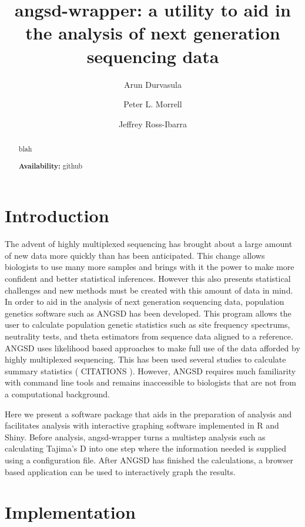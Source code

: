 \documentclass[12pt]{article}
\title{angsd-wrapper: a utility to aid in the analysis of next generation sequencing data}
\author[1]{Arun Durvasula}
\author[2]{Peter L. Morrell}
\author[1,3]{Jeffrey Ross-Ibarra}
\affil[1]{Department of Plant Sciences, University of California Davis}
\affil[2]{Department of Agronomy and Plant Genetics, University of Minnesota}
\affil[3]{Center for Population Biology and Genome Center, University of California Davis}
\date{}
\begin{document}
\maketitle

\begin{abstract}
blah

\textbf{Availability:} github
\end{abstract}

\section*{Introduction}
The advent of highly multiplexed sequencing has brought about a large amount of new data more quickly than has been anticipated. 
This change allows biologists to use many more samples and brings with it the power to make more confident and better statistical inferences.  %
However this also presents statistical challenges and new methods must be created with this amount of data in mind. 
In order to aid in the analysis of next generation sequencing data, population genetics software such as ANGSD has been developed. This program allows the user to calculate population genetic statistics such as site frequency spectrums, neutrality tests, and theta estimators from sequence data aligned to a reference. ANGSD uses likelihood based approaches to make full use of the data afforded by highly multiplexed sequencing. This has been used several studies to calculate summary statistics ( CITATIONS ). However, ANGSD requires much familiarity with command line tools and remains inaccessible to biologists that are not from a computational background. 

Here we present a software package that aids in the preparation of analysis and facilitates analysis with interactive graphing software implemented in R and Shiny. Before analysis, angsd-wrapper turns a multistep analysis such as calculating Tajima's D into one step where the information needed is supplied using a configuration file. After ANGSD has finished the calculations, a browser based application can be used to interactively graph the results.

\section*{Implementation}
\end{document}

